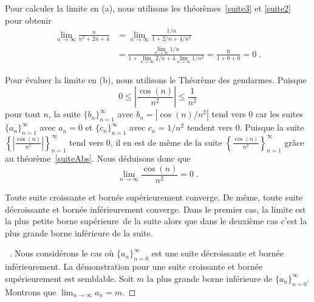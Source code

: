 {\begin{egg}
Pour calculer la limite en (a), nous utilisons les
théorèmes~\ref{suite3} et \ref{suite2} pour obtenir
\begin{align*}
\lim_{n\rightarrow \infty} \frac{n}{n^2+2n+4}
&= \lim_{n\rightarrow \infty} \frac{1/n}{1+2/n+4/n^2} \\
&= \frac{\displaystyle \lim_{n\rightarrow \infty} 1/n}
{\displaystyle 1 + \lim_{n\rightarrow \infty} 2/n
+ 4 \lim_{n\rightarrow \infty} 1/n^2} = \frac{0}{1+0+0} = 0 \; .
\end{align*}

Pour évaluer la limite en (b), nous utilisons le
Théorème des gendarmes.  Puisque
\[
0 \leq \left| \frac{\cos(n)}{n^2} \right| \leq \frac{1}{n^2}
\]
pour tout $n$, la suite $\{b_n\}_{n=1}^\infty$ avec $b_n = |\cos(n)/n^2|$
tend vers $0$ car les suites $\{a_n\}_{n=1}^\infty$ avec $a_n = 0$ et
$\{c_n\}_{n=1}^\infty$ avec $c_n = 1/n^2$ tendent vers $0$.  Puisque la
suite
$\displaystyle \left\{ \left| \frac{\cos(n)}{n^2} \right|\right\}_{n=1}^\infty$
tend vers $0$, il en est de même de la suite 
$\displaystyle \left\{\frac{\cos(n)}{n^2}\right\}_{n=1}^\infty$ grâce
au théorème~\ref{suiteAbs}.  Nous déduisons donc que
\[
\lim_{n\rightarrow \infty} \frac{\cos(n)}{n^2} = 0 \; .
\]
\end{egg}

\begin{theorem}[+\theory]
Toute suite croissante et bornée supérieurement converge.  De même,
toute suite décroissante et bornée inférieurement converge.  Dans le
premier cas, la limite est la plus petite borne
supérieure\footnotemark\ de la suite alors que dans le deuxième cas
c'est la plus grande borne inférieure de la suite.
\label{suiteBORN}
\end{theorem}


\begin{proof}[\UOproof\ \theory]
Nous considérons le cas où $\displaystyle \{ a_n \}_{n=0}^\infty$ est une
suite décroissante et bornée inférieurement.  La démonstration pour
une suite croissante et bornée supérieurement est semblable.  Soit $m$
la plus grande borne inférieure de
$\displaystyle \{ a_n \}_{n=0}^\infty$.  Montrons que
$\displaystyle \lim_{n\to \infty} a_n = m$.


\end{proof}}

